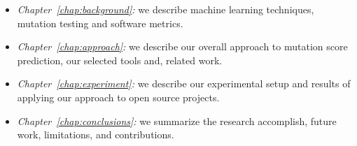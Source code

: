 \begin{itemize}
  \item \emph{Chapter~\ref{chap:background}:} we describe machine learning techniques, mutation testing and software metrics.
  \item \emph{Chapter~\ref{chap:approach}:} we describe our overall approach to mutation score prediction, our selected tools and, related work.
  \item \emph{Chapter~\ref{chap:experiment}:} we describe our experimental setup and results of applying our approach to open source projects.
  \item \emph{Chapter~\ref{chap:conclusions}:} we summarize the research accomplish, future work, limitations, and contributions.
\end{itemize}
